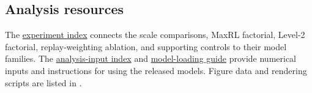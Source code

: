 \documentclass{article}
\newcommand{\1}{\mathbf 1}
\theoremstyle{remark}
\theoremstyle{definition}
\theoremstyle{plain}
\begin{document}
\subsection{Analysis resources}
\label{app:repro-recovery}

The \href{https://huggingface.co/od2961/maxent-grpo-models/blob/main/EXPERIMENTS.md}{experiment index}
connects the scale comparisons, MaxRL factorial, Level-2 factorial,
replay-weighting ablation, and supporting controls to their model families.
The \href{https://huggingface.co/od2961/maxent-grpo-models/blob/main/DATA.md}{analysis-input index}
and \href{https://huggingface.co/od2961/maxent-grpo-models/blob/main/RESTORE.md}{model-loading guide}
provide numerical inputs and instructions for using the released models.
Figure data and rendering scripts are listed in
\mbox{}.
\end{document}
